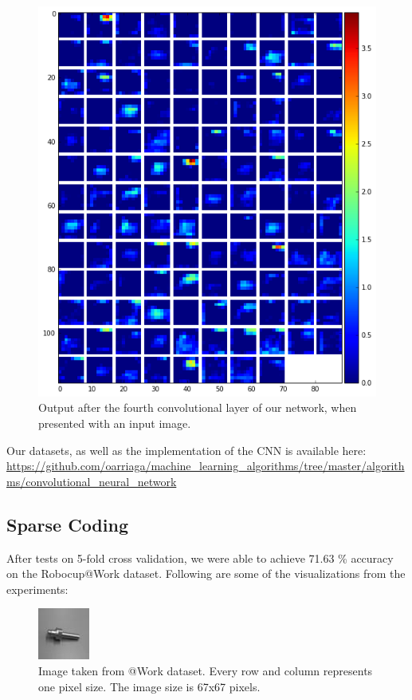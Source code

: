 \documentclass[	DIV=calc,%
				paper=a4,%
				fontsize=11pt,%
				twocolumn]{scrartcl}	 %
\begin{document}
\begin{figure}[H]
    \centering
    \includegraphics[width=0.5\linewidth]{data/final_cnn_fourthlayer}
    \caption{Output after the fourth convolutional layer of our network, when presented with an input image.}
\end{figure}

Our datasets, as well as the implementation of the CNN is available here: \url{https://github.com/oarriaga/machine_learning_algorithms/tree/master/algorithms/convolutional_neural_network}


\subsection*{Sparse Coding}
After tests on 5-fold cross validation, we were able to achieve 71.63 \% accuracy on the Robocup@Work dataset. Following are some of the visualizations from the experiments:

\begin{figure}[H]
    \centering
    \includegraphics[width=0.5\linewidth]{data/sc_data/sc_atwork_image.jpg}
    \caption{Image taken from @Work dataset. Every row and column represents one pixel size. The image size is 67x67 pixels.}
    \label{sc_atwork_image}
\end{figure}
\end{document}

